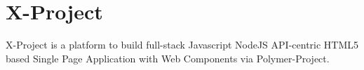 \section{X-Project}
\label{sec:XPR_xpr}

X-Project is a platform to build full-stack Javascript NodeJS API-centric HTML5 based Single Page Application with Web Components via Polymer-Project.
